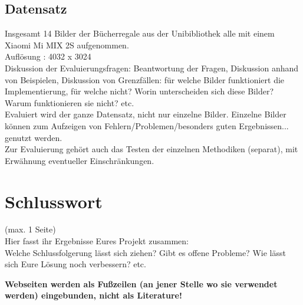 \documentclass[paper=A4, deutsch]{scrartcl}
\begin{document}
\subsection{Datensatz}
Insgesamt 14 Bilder der Bücherregale aus der Unibibliothek alle mit einem Xiaomi Mi MIX 2S aufgenommen.\\
Auflösung : 4032 x 3024\\
Diskussion der Evaluierungsfragen: Beantwortung der Fragen, Diskussion anhand von Beispielen, Diskussion von Grenzfällen: für welche Bilder funktioniert die Implementierung, für welche nicht? Worin unterscheiden sich diese Bilder? Warum funktionieren sie nicht? etc.\\
Evaluiert wird der ganze Datensatz, nicht nur einzelne Bilder. Einzelne Bilder können zum Aufzeigen von Fehlern/Problemen/besonders guten Ergebnissen... genutzt werden.\\
Zur Evaluierung gehört auch das Testen der einzelnen Methodiken (separat), mit Erwähnung eventueller Einschränkungen.

\section{Schlusswort}
(max. 1 Seite)\\
Hier fasst ihr Ergebnisse Eures Projekt zusammen:\\
Welche Schlussfolgerung lässt sich ziehen? Gibt es offene Probleme? Wie lässt sich Eure Lösung noch verbessern? etc.



\textbf{Webseiten werden als Fußzeilen (an jener Stelle wo sie verwendet werden) eingebunden, nicht als Literature!}
\end{document}
